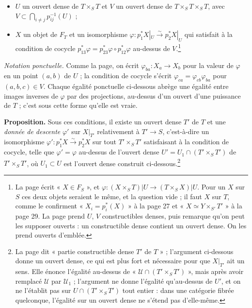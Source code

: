 \documentclass[11pt,a4paper]{article}
\begin{document}
\begin{itemize}
\item $U$ un ouvert dense de $T \times_S T$ et $V$ un ouvert dense de $T
\times_S T \times_S T$, avec $V \subset \bigcap_{i \neq j}
p_{ij}^{-1}(U)$ ;
\item $X$ un objet de $F_T$ et un isomorphisme $\varphi : p_1^{*}X|_U
\xrightarrow{\sim} p_2^{*}X|_U$ qui satisfait à la condition de cocycle
$p_{13}^{*}\varphi = p_{23}^{*}\varphi \circ p_{12}^{*}\varphi$ au-dessus de
$V$.\footnote{La page écrit « $X \in F_S$ », et $\varphi : (X \times_S T)|U
\to (T \times_S X)|U$. Pour un $X$ sur $S$ ces deux objets seraient le même,
et la question vide ; il faut $X$ sur $T$, comme le confirment « $X_i =
p_i^{*}(X)$ » à la page 27 et « $X \simeq Y \times_{S'} T'$ » à la page 29. La
page prend $U$, $V$ constructibles denses, puis remarque qu'on peut les
supposer ouverts : un constructible dense contient un ouvert dense. On les
prend ouverts d'emblée.}
\end{itemize}

\emph{Notation ponctuelle.} Comme la page, on écrit $\varphi_{ba} : X_a \to
X_b$ pour la valeur de $\varphi$ en un point $(a, b)$ de $U$ ; la condition
de cocycle s'écrit $\varphi_{ca} = \varphi_{cb}\varphi_{ba}$ pour $(a, b, c)
\in V$. Chaque égalité ponctuelle ci-dessous abrège une égalité entre images
inverses de $\varphi$ par des projections, au-dessus d'un ouvert d'une
puissance de $T$ ; c'est sous cette forme qu'elle est vraie.

\textbf{Proposition.} Sous ces conditions, il existe un ouvert dense $T'$ de
$T$ et une \emph{donnée de descente} $\varphi'$ sur $X|_{T'}$ relativement à
$T' \to S$, c'est-à-dire un isomorphisme $\varphi' : p_1^{*}X
\xrightarrow{\sim} p_2^{*}X$ sur tout $T' \times_S T'$ satisfaisant à la
condition de cocycle, telle que $\varphi' = \varphi$ au-dessus de l'ouvert
dense $U' = U_1 \cap (T' \times_S T')$ de $T' \times_S T'$, où $U_1 \subset U$
est l'ouvert dense construit ci-dessous.\footnote{La page dit « partie
constructible dense $T'$ de $T$ » ; l'argument ci-dessous donne un ouvert
dense, ce qui est plus fort et nécessaire pour que $X|_{T'}$ ait un sens. Elle
énonce l'égalité au-dessus de « $\mathcal{U} \cap (T' \times_S T')$ », mais
après avoir remplacé $\mathcal{U}$ par $\mathcal{U}_1$ ; l'argument ne donne
l'égalité qu'au-dessus de $U'$, et on ne l'établit pas sur $U \cap (T'
\times_S T')$ tout entier : dans une catégorie fibrée quelconque, l'égalité
sur un ouvert dense ne s'étend pas d'elle-même.}
\end{document}
